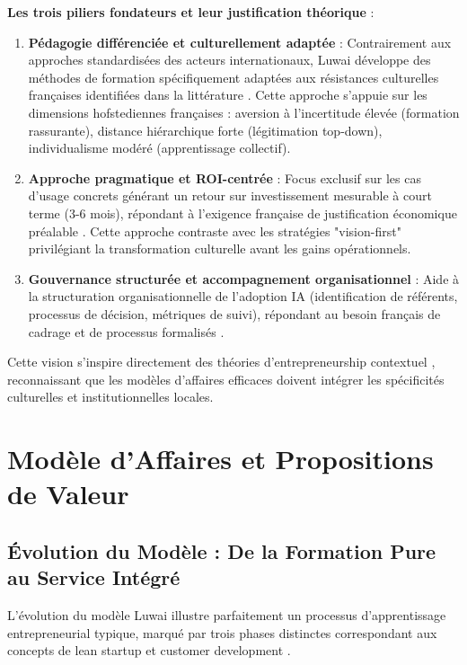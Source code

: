 \textbf{Les trois piliers fondateurs et leur justification théorique} :

\begin{enumerate}
    \item \textbf{Pédagogie différenciée et culturellement adaptée} : Contrairement aux approches standardisées des acteurs internationaux, Luwai développe des méthodes de formation spécifiquement adaptées aux résistances culturelles françaises identifiées dans la littérature \cite{meyer2014culture}. Cette approche s'appuie sur les dimensions hofstediennes françaises : aversion à l'incertitude élevée (formation rassurante), distance hiérarchique forte (légitimation top-down), individualisme modéré (apprentissage collectif).

    \item \textbf{Approche pragmatique et ROI-centrée} : Focus exclusif sur les cas d'usage concrets générant un retour sur investissement mesurable à court terme (3-6 mois), répondant à l'exigence française de justification économique préalable \cite{anthony2020planning}. Cette approche contraste avec les stratégies "vision-first" privilégiant la transformation culturelle avant les gains opérationnels.

    \item \textbf{Gouvernance structurée et accompagnement organisationnel} : Aide à la structuration organisationnelle de l'adoption IA (identification de référents, processus de décision, métriques de suivi), répondant au besoin français de cadrage et de processus formalisés \cite{bureaucracy2024france}.
\end{enumerate}

Cette vision s'inspire directement des théories d'entrepreneurship contextuel \cite{welter2011contextualizing}, reconnaissant que les modèles d'affaires efficaces doivent intégrer les spécificités culturelles et institutionnelles locales.

\section{Modèle d'Affaires et Propositions de Valeur}

\subsection{Évolution du Modèle : De la Formation Pure au Service Intégré}

L'évolution du modèle Luwai illustre parfaitement un processus d'apprentissage entrepreneurial typique, marqué par trois phases distinctes correspondant aux concepts de lean startup et customer development \cite{blank2013startup,ries2011lean}.

